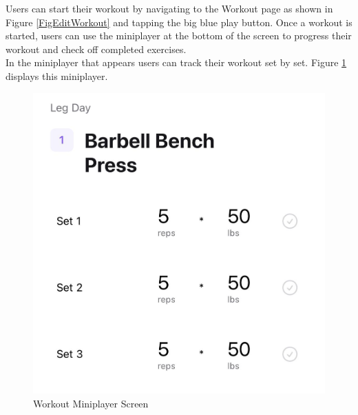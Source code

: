 \documentclass{article}
\begin{document}
Users can start their workout by navigating to the Workout page as shown in Figure \ref{FigEditWorkout} and tapping the big blue play button. Once a workout is started, users can use the miniplayer at the bottom of the screen to progress their workout and check off completed exercises.\\
In the miniplayer that appears users can track their workout set by set. Figure \ref{FigMiniplayer} displays this miniplayer.

\begin{figure}[H]
    \centering
    \includegraphics[height=0.6\textwidth]{imgs/Miniplayer.jpg}
    \caption{Workout Miniplayer Screen}
    \label{FigMiniplayer}
    \end{figure}
\end{document}
